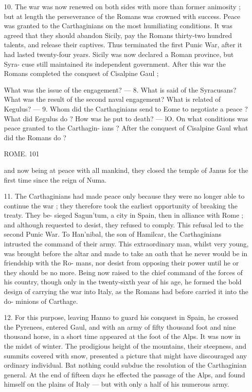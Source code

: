 \documentclass[openany,a4paper]{memoir}
\begin{document}
10. The war was now renewed on both sides with more 
than former animosity ; but at length the perseverance of the 
Romans was crowned with success. Peace was granted to 
the Carthaginians on the most humiliating conditions. It 
was agreed that they should abandon Sicily, pay the Romans 
thirty-two hundred talents, and release their captives. Thus 
terminated the first Punic War, after it had lasted twenty-four 
years. Sicily was now declared a Roman province, but Syra- 
cuse still maintained its independent government. After this 
war the Romans completed the conquest of Cisalpine Gaul ; 

What was the issue of the engagement? — 8. What is said of the 
Syracusans? What was the result of the second naval engagement? 
What is related of Kegulus? — 9. Whom did the Carthaginians send to 
Eome to negotiate a peace ? What did Eegulus do ? How was he put 
to death? — lO. On what conditions was peace granted to the Carthagin- 
ians ? After the conquest of Cisalpine Gaul what did the Romans do ? 



ROME. 101 

and now being at peace with all mankind, they closed the 
temple of Janus for the first time since the reign of Numa. 

11. The Carthaginians had made peace only because they 
were no longer able to continue the war ; they therefore took 
the earliest opportunity of breaking the treaty. They be- 
sieged Sagun'tum, a city in Spain, then in alliance with 
Rome ; and although requested to desist, they refused to 
comply. This refusal led to the second Punic War. To 
Han'nibal, the son of Hamilcar, the Carthaginians intrusted 
the command of their army. This extraordinary man, whilst 
very young, was brought before the altar and made to take 
an oath that he never would be in friendship with the Ro- 
mans, nor desist from opposing their power until he or they 
should be no more. Being now raised to the chief command 
of the forces of his country, though only in the twenty-sixth 
year of his age, he formed the bold design of carrying the war 
into Italy, as the Romans had before carried it into the do- 
minions of Carthage. 

12. For this purpose, leaving Hanno to guard his conquest 
in Spain, he crossed the Pyrenees, entered Gaul, and with an 
army of fifty thousand foot and nine thousand horse, in a 
short time appeared at the foot of the Alps. It was now in 
the midst of winter. The prodigious height of the mountains, 
their steepness, and summits covered with snow, presented a 
picture that might have discouraged any ordinary individual. 
Bat nothing could subdue the resolution of the Carthaginian 
general. At the end of fifteen days he effected the passage of 
the Alps, and found himself on the plains of Italy — but with 
only a half of his numerous army. 
\end{document}
